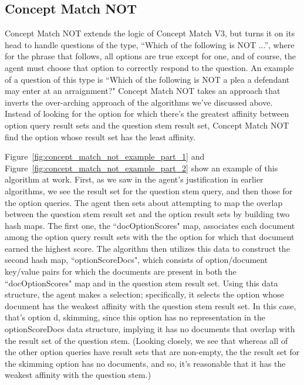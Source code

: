 \subsection{Concept Match NOT}

Concept Match NOT extends the logic of Concept Match V3, but turns it on its head to handle questions of the type, ``Which of the following is NOT ...'', where for the phrase that follows, all options are true except for one, and of course, the agent must choose that option to correctly respond to the question.  An example of a question of this type is ``Which of the following is NOT a plea a defendant may enter at an arraignment?"
Concept Match NOT takes an approach that inverts the over-arching approach of the algorithms we've discussed above.  Instead of looking for the option for which there's the greatest affinity between option query result sets and the question stem result set, Concept Match NOT find the option whose result set has the least affinity.  

Figure~\ref{fig:concept_match_not_example_part_1} and Figure~\ref{fig:concept_match_not_example_part_2} show an example of this algorithm at work.  First, as we saw in the agent's justification in earlier algorithms, we see the result set for the question stem query, and then those for the option queries.  The agent then sets about attempting to map the overlap between the question stem result set and the option result sets by building two hash maps.  The first one, the ``docOptionScores" map, associates each document among the option query result sets with the the option for which that document earned the highest score.  The algorithm then utilizes this data to construct the second hash map, ``optionScoreDocs", which consists of option/document key/value pairs for which the documents are present in both the ``docOptionScores" map and in the question stem result set.  Using this data structure, the agent makes a selection; specifically, it selects the option whose document has the weakest affinity with the question stem result set.  In this case, that's option d, skimming, since this option has no representation in the optionScoreDocs data structure, implying it has no documents that overlap with the result set of the question stem.  (Looking closely, we see that whereas all of the other option queries have result sets that are non-empty, the the result set for the skimming option has no documents, and so, it's reasonable that it has the weakest affinity with the question stem.) 



